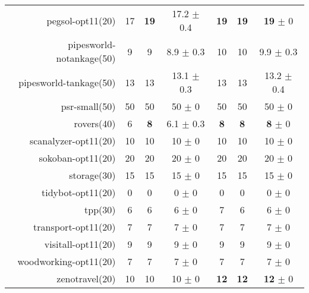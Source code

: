 \begin{center}
\begin{tabular}{|r|*{2}{ccc|}}
pegsol-opt11(20) & 17 & \textbf{19} & 17.2 $\pm$ 0.4 & \textbf{19} & \textbf{19} & \textbf{19} $\pm$ 0\\
pipesworld-notankage(50) & 9 & 9 & 8.9 $\pm$ 0.3 & 10 & 10 & 9.9 $\pm$ 0.3\\
pipesworld-tankage(50) & 13 & 13 & 13.1 $\pm$ 0.3 & 13 & 13 & 13.2 $\pm$ 0.4\\
psr-small(50) & 50 & 50 & 50 $\pm$ 0 & 50 & 50 & 50 $\pm$ 0\\
rovers(40) & 6 & \textbf{8} & 6.1 $\pm$ 0.3 & \textbf{8} & \textbf{8} & \textbf{8} $\pm$ 0\\
scanalyzer-opt11(20) & 10 & 10 & 10 $\pm$ 0 & 10 & 10 & 10 $\pm$ 0\\
sokoban-opt11(20) & 20 & 20 & 20 $\pm$ 0 & 20 & 20 & 20 $\pm$ 0\\
storage(30) & 15 & 15 & 15 $\pm$ 0 & 15 & 15 & 15 $\pm$ 0\\
tidybot-opt11(20) & 0 & 0 & 0 $\pm$ 0 & 0 & 0 & 0 $\pm$ 0\\
tpp(30) & 6 & 6 & 6 $\pm$ 0 & 7 & 6 & 6 $\pm$ 0\\
transport-opt11(20) & 7 & 7 & 7 $\pm$ 0 & 7 & 7 & 7 $\pm$ 0\\
visitall-opt11(20) & 9 & 9 & 9 $\pm$ 0 & 9 & 9 & 9 $\pm$ 0\\
woodworking-opt11(20) & 7 & 7 & 7 $\pm$ 0 & 7 & 7 & 7 $\pm$ 0\\
zenotravel(20) & 10 & 10 & 10 $\pm$ 0 & \textbf{12} & \textbf{12} & \textbf{12} $\pm$ 0\\
\end{tabular}
\end{center}
